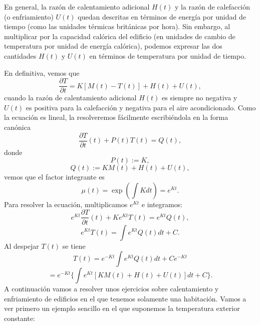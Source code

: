 En general, la razón de calentamiento adicional $H(t)$ y la razón de calefacción
(o enfriamiento) $U(t)$ quedan descritas en términos de energía por unidad de tiempo
(como las unidades térmicas británicas por hora). Sin embargo, al multiplicar por la
capacidad calórica del edificio (en unidades de cambio de temperatura por unidad de energía calórica), podemos expresar las dos cantidades $H(t)$ y $U(t)$ en términos de temperatura por unidad de tiempo.

En definitiva, vemos que 
\begin{equation}
	\dfrac{\partial T}{\partial t} = K[M(t) - T(t)] + H(t) + U(t),
\end{equation}
cuando la razón de calentamiento adicional $H(t)$ es siempre no negativa y $U(t)$ es positiva para la calefacción y negativa para el aire acondicionado. Como la ecuación es lineal, la resolveremos fácilmente escribiéndola en la forma canónica
\begin{equation}
	\dfrac{\partial T}{\partial t}(t) + P(t)T(t) = Q(t),
\end{equation}
donde
\begin{equation}
	P(t) := K,
\end{equation}
\begin{equation}\label{eq:apli1}
	Q(t) := KM(t) + H(t) + U(t),
\end{equation}
vemos que el factor integrante es
\begin{equation}
	\mu (t) = \exp(\int Kdt) = e^{Kt}.
\end{equation}
Para resolver la ecuación, multiplicamos $e^{Kt}$ e integramos:
\begin{equation}
	e^{Kt}\dfrac{\partial T}{\partial t}(t) + Ke^{Kt}T(t) = e^{Kt}Q(t),
\end{equation}
\begin{equation}
	e^{Kt}T(t) = \int e^{Kt}Q(t)dt + C.
\end{equation}
Al despejar $T(t)$ se tiene
\begin{equation}\label{eq:apli2}
	T(t) = e^{-Kt}\int e^{Kt}Q(t)dt + Ce^{-Kt}
\end{equation}
\begin{equation}
	= e^{-Kt}\{\int e^{Kt}[KM(t) + H(t) + U(t)]dt + C\}.
\end{equation}
A continuación vamos a resolver unos ejercicios sobre calentamiento y enfriamiento de edificios en el que tenemos solamente una habitación. Vamos a ver primero un ejemplo sencillo en el que suponemos la temperatura exterior constante:
